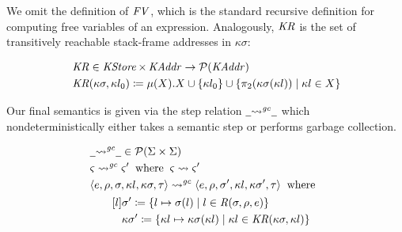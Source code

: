 We omit the definition of $ \operatorname{\mathit{FV}} $, which is the standard recursive
definition for computing free variables of an expression. Analogously,
$ \operatorname{\mathit{KR}} $ is the set of transitively reachable stack-frame addresses
in $ \kappa  \sigma $:

\small\begin{align*}
&\hspace{0em}  \operatorname{\mathit{KR}}   \in   \operatorname{\mathit{KStore}}   \times   \operatorname{\mathit{KAddr}}   \rightarrow   \mathcal{P}  (\operatorname{\mathit{KAddr}})  \\
&\hspace{0em}  \operatorname{\mathit{KR}}(  \kappa  \sigma , \kappa l _0 )  \coloneqq   \mu (X). X  \cup   \{  \kappa l _0  \}   \cup   \{  \pi  _2 ( \kappa  \sigma ( \kappa l))  \;|\;   \kappa l  \in  X \} 
\end{align*}\normalsize

\par

Our final semantics is given via the step relation
$ \underline{\hspace{0.5em}}{  \rightsquigarrow   ^{ \operatorname{\mathit{gc}} }   }\underline{\hspace{0.5em}} $
which nondeterministically either takes a semantic step or performs
garbage collection.

\small\begin{align*}
&\hspace{0em}  \underline{\hspace{0.5em}}{  \rightsquigarrow   ^{ \itop{gc} }   }\underline{\hspace{0.5em}}   \in   \mathcal{P} ( \Sigma   \times   \Sigma ) \\
&\hspace{0em}  \varsigma   \rightsquigarrow   ^{ \itop{gc} }    \varsigma '  \;\;\text{where}\;\;   \varsigma   \rightsquigarrow   \varsigma ' \\
&\hspace{0em}  \langle e, \rho , \sigma , \kappa l, \kappa  \sigma , \tau  \rangle   \rightsquigarrow   ^{ \itop{gc} }    \langle e, \rho , \sigma ', \kappa l, \kappa  \sigma ', \tau  \rangle   \;\;\text{where}\;\;   \\
&\hspace{2em}  \begin{aligned}[l]  &  \sigma '  \coloneqq   \{ l  \mapsto   \sigma (l)  \;|\;  l  \in   \itop{R}(  \sigma , \rho ,e) \}   \\  &  \kappa  \sigma '  \coloneqq   \{  \kappa l  \mapsto   \kappa  \sigma ( \kappa l)  \;|\;   \kappa l  \in   \itop{KR}(  \kappa  \sigma , \kappa l) \}   \end{aligned} 
\end{align*}\normalsize


